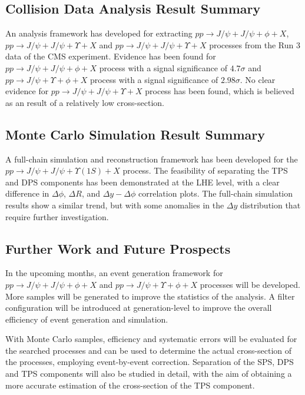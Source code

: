 \documentclass[10pt,twocolumn]{article}
\begin{document}
\subsection{Collision Data Analysis Result Summary}

An analysis framework has developed for extracting $pp \to J/\psi+J/\psi+\phi+X$, $pp \to J/\psi+J/\psi+\Upsilon+X$ and $pp \to J/\psi+J/\psi+\Upsilon+X$ processes from the Run 3 data of the CMS experiment. Evidence has been found for $pp \to J/\psi+J/\psi+\phi+X$ process with a signal significance of $4.7\sigma$ and $pp \to J/\psi+\Upsilon+\phi+X$ process with a signal significance of $2.98\sigma$. No clear evidence for $pp \to J/\psi+J/\psi+\Upsilon+X$ process has been found, which is believed as an result of a relatively low cross-section.

\subsection{Monte Carlo Simulation Result Summary}

A full-chain simulation and reconstruction framework has been developed for the $pp \to J/\psi+J/\psi+\Upsilon(1S)+X$ process. The feasibility of separating the TPS and DPS components has been demonstrated at the LHE level, with a clear difference in $\Delta \phi$, $\Delta R$, and $\Delta y - \Delta \phi$ correlation plots. The full-chain simulation results show a similar trend, but with some anomalies in the $\Delta y$ distribution that require further investigation.

\subsection{Further Work and Future Prospects}

In the upcoming months, an event generation framework for $pp\to J/\psi+J/\psi+\phi+X$ and $pp\to J/\psi+\Upsilon+\phi+X$ processes will be developed. More samples will be generated to improve the statistics of the analysis. A filter configuration will be introduced at generation-level to improve the overall efficiency of event generation and simulation.

With Monte Carlo samples, efficiency and systematic errors will be evaluated for the searched processes and can be used to determine the actual cross-section of the processes, employing event-by-event correction. Separation of the SPS, DPS and TPS components will also be studied in detail, with the aim of obtaining a more accurate estimation of the cross-section of the TPS component.
\end{document}

